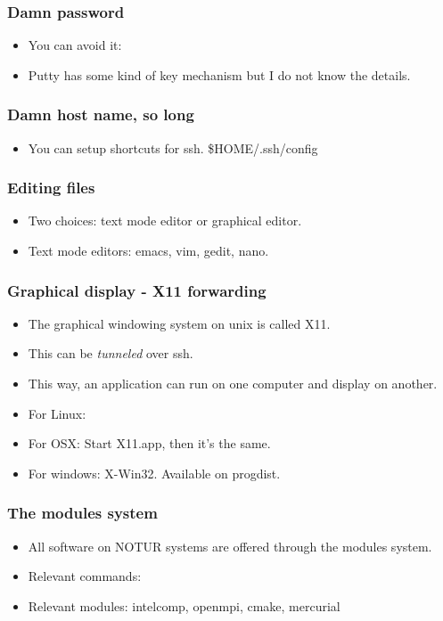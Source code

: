 \documentclass{beamer}
\begin{document}
\begin{frame}\frametitle{Damn password}
\begin{itemize}
    \item You can avoid it: 
    \item Putty has some kind of key mechanism but I do not know the details.
\end{itemize}
\end{frame}
\begin{frame}\frametitle{Damn host name, so long}
\begin{itemize}
    \item You can setup shortcuts for ssh. \$HOME/.ssh/config
        
\end{itemize}
\end{frame}
\begin{frame}\frametitle{Editing files}
\begin{itemize}
    \item Two choices: text mode editor or graphical editor.
    \item Text mode editors: emacs, vim, gedit, nano.
\end{itemize}
\end{frame}
\begin{frame}\frametitle{Graphical display - X11 forwarding}
\begin{itemize}
    \item The graphical windowing system on unix is called X11.
    \item This can be \emph{tunneled} over ssh.
    \item This way, an application can run on one computer and display
        on another.
    \item For Linux: 
    \item For OSX: Start X11.app, then it's the same.
    \item For windows: X-Win32. Available on progdist.
\end{itemize}
\end{frame}
\begin{frame}\frametitle{The modules system}
\begin{itemize}
    \item All software on NOTUR systems are offered through the modules system.
    \item Relevant commands: 
    \item Relevant modules: intelcomp, openmpi, cmake, mercurial
\end{itemize}
\end{frame}
\end{document}
